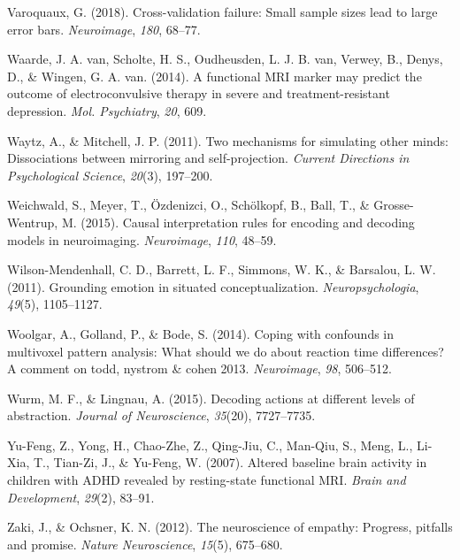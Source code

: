\documentclass[12pt,american,a4paper,oneside,]{memoir} %
\begin{document}
\leavevmode\hypertarget{ref-varoquaux2018cross}{}%
Varoquaux, G. (2018). Cross-validation failure: Small sample sizes lead to large error bars. \emph{Neuroimage}, \emph{180}, 68--77.

\leavevmode\hypertarget{ref-Van_Waarde2014-sh}{}%
Waarde, J. A. van, Scholte, H. S., Oudheusden, L. J. B. van, Verwey, B., Denys, D., \& Wingen, G. A. van. (2014). A functional MRI marker may predict the outcome of electroconvulsive therapy in severe and treatment-resistant depression. \emph{Mol. Psychiatry}, \emph{20}, 609.

\leavevmode\hypertarget{ref-waytz2011two}{}%
Waytz, A., \& Mitchell, J. P. (2011). Two mechanisms for simulating other minds: Dissociations between mirroring and self-projection. \emph{Current Directions in Psychological Science}, \emph{20}(3), 197--200.

\leavevmode\hypertarget{ref-Weichwald2015-aj}{}%
Weichwald, S., Meyer, T., Özdenizci, O., Schölkopf, B., Ball, T., \& Grosse-Wentrup, M. (2015). Causal interpretation rules for encoding and decoding models in neuroimaging. \emph{Neuroimage}, \emph{110}, 48--59.

\leavevmode\hypertarget{ref-wilson2011grounding}{}%
Wilson-Mendenhall, C. D., Barrett, L. F., Simmons, W. K., \& Barsalou, L. W. (2011). Grounding emotion in situated conceptualization. \emph{Neuropsychologia}, \emph{49}(5), 1105--1127.

\leavevmode\hypertarget{ref-Woolgar2014-jb}{}%
Woolgar, A., Golland, P., \& Bode, S. (2014). Coping with confounds in multivoxel pattern analysis: What should we do about reaction time differences? A comment on todd, nystrom \& cohen 2013. \emph{Neuroimage}, \emph{98}, 506--512.

\leavevmode\hypertarget{ref-wurm2015decoding}{}%
Wurm, M. F., \& Lingnau, A. (2015). Decoding actions at different levels of abstraction. \emph{Journal of Neuroscience}, \emph{35}(20), 7727--7735.

\leavevmode\hypertarget{ref-Yu-Feng2007-sg}{}%
Yu-Feng, Z., Yong, H., Chao-Zhe, Z., Qing-Jiu, C., Man-Qiu, S., Meng, L., Li-Xia, T., Tian-Zi, J., \& Yu-Feng, W. (2007). Altered baseline brain activity in children with ADHD revealed by resting-state functional MRI. \emph{Brain and Development}, \emph{29}(2), 83--91.

\leavevmode\hypertarget{ref-zaki2012neuroscience}{}%
Zaki, J., \& Ochsner, K. N. (2012). The neuroscience of empathy: Progress, pitfalls and promise. \emph{Nature Neuroscience}, \emph{15}(5), 675--680.
\end{document}
